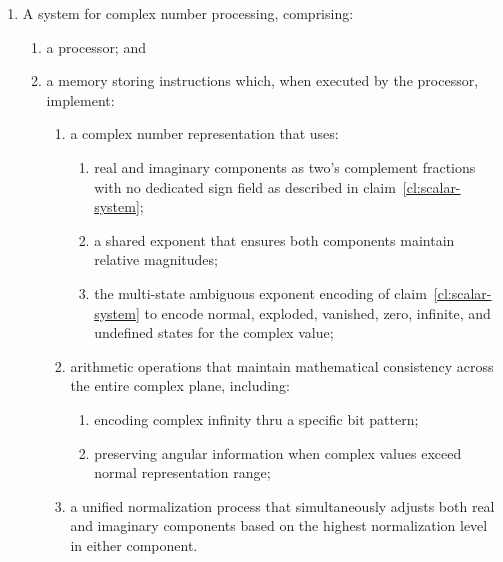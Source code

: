 \documentclass[12pt,letter]{article}
\begin{document}
\begin{enumerate}
          \item\label{cl:circle-system} A system for complex number processing, comprising:
          \begin{enumerate}
              \item a processor; and
              \item a memory storing instructions which, when executed by the processor, implement:
                    \begin{enumerate}
                        \item a complex number representation that uses:
                              \begin{enumerate}
                                  \item real and imaginary components as two's complement fractions with no dedicated sign field as described in claim~\ref{cl:scalar-system};
                                  \item a shared exponent that ensures both components maintain relative magnitudes;
                                  \item the multi-state ambiguous exponent encoding of claim~\ref{cl:scalar-system} to encode normal, exploded, vanished, zero, infinite, and undefined states for the complex value;
                              \end{enumerate}
                        \item arithmetic operations that maintain mathematical consistency across the entire complex plane, including:
                              \begin{enumerate}
                                  \item encoding complex infinity thru a specific bit pattern;
                                  \item preserving angular information when complex values exceed normal representation range;
                              \end{enumerate}
                        \item a unified normalization process that simultaneously adjusts both real and imaginary components based on the highest normalization level in either component.
                    \end{enumerate}
          \end{enumerate}


\end{enumerate}
\end{document}
